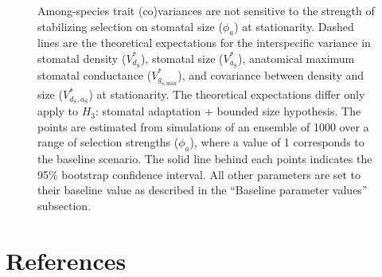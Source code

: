 \documentclass[
  letterpaper,
  DIV=11,
  numbers=noendperiod]{scrartcl}
\begin{document}
\begin{figure}
\caption{Among-species trait (co)variances are not sensitive to the strength of stabilizing selection on stomatal size ($\phi_a$) at stationarity. Dashed lines are the theoretical expectations for the interspecific variance in stomatal density ($V_{d_\mathrm{S}}^*$), stomatal size ($V_{a_\mathrm{S}}^*$), anatomical maximum stomatal conductance ($V_{g_\mathrm{s,max}}^*$), and covariance between density and size ($V_{d_\mathrm{S},a_\mathrm{S}}^*$) at stationarity. The theoretical expectations differ only apply to $H_3$: stomatal adaptation + bounded size hypothesis. The points are estimated from simulations of an ensemble of 1000 over a range of selection strengths ($\phi_a$), where a value of 1 corresponds to the baseline scenario. The solid line behind each points indicates the 95\% bootstrap confidence interval. All other parameters are set to their baseline value as described in the ``Baseline parameter values'' subsection.}

\end{figure}

\clearpage

\section*{References}\label{references}
\end{document}
